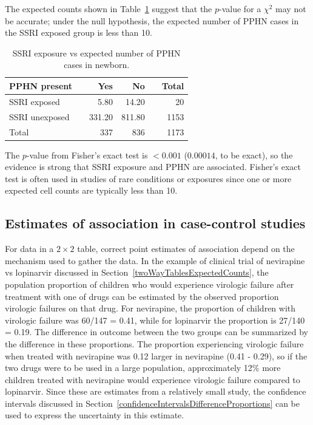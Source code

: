 The expected counts shown in Table~\ref{ssriPPHNExpected} suggest that the $p$-value for a $\chi^2$ may not be accurate; under the null hypothesis, the expected number of PPHN cases in the SSRI exposed group is less than 10.

 \begin{table}[h]
	\centering
	\begin{tabular}{ll rrr r}
		\hline
		PPHN present  & \hspace{2mm} & Yes & No & \hspace{2mm} & Total \\
		\hline
		SSRI exposed &	& 5.80 & 14.20 &  & 20  \\
		SSRI unexposed & & 331.20 & 811.80 &  & 1153  \\
        Total & & 337 & 836 & & 1173 \\
		\hline
	\end{tabular}
    \caption{SSRI exposure vs expected number of PPHN cases in newborn.}
    \label{ssriPPHNExpected}
\end{table}	

The $p$-value from Fisher's exact test is $< 0.001$ ($0.00014$, to be exact), so the evidence is strong that SSRI exposure and PPHN are associated. Fisher's exact test is often used in studies of rare conditions or exposures since one or more expected cell counts are typically less than 10.


\subsection{Estimates of association in case-control studies}

\label{caseControlStudiesEstimates}


For data in a $2 \times 2$ table, correct point estimates of association depend on the mechanism used to gather the data.  In the example of clinical trial of nevirapine vs lopinarvir discussed in Section~\ref{twoWayTablesExpectedCounts}, the population proportion of children who would experience virologic failure after treatment with one of drugs can be estimated by the observed proportion virologic failures  on that drug. For nevirapine, the proportion of children with virologic failure was 60/147 = 0.41, while for lopinarvir the proportion is 27/140 = 0.19.  The difference in outcome between the two groups can be summarized by the difference in these proportions. The proportion experiencing virologic failure when treated with nevirapine was 0.12 larger in nevirapine (0.41 - 0.29), so if the two drugs were to be used in a large population, approximately 12\% more children treated with nevirapine would experience virologic failure compared to lopinarvir. Since these are estimates from a relatively small study, the confidence intervals discussed in Section~\ref{confidenceIntervalsDifferenceProportions} can be used to express the uncertainty in this estimate.

